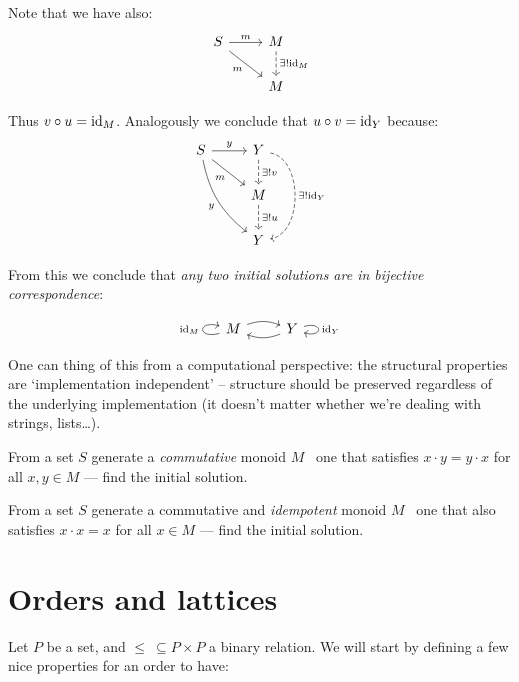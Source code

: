 Note that we have also:
$$
\begin{tikzcd}
    S \arrow[r, "m"] \arrow[rd, swap, "m"] & 
    M \arrow[d, dashed, "\exists! \id{M}"] \\
    {} & M
\end{tikzcd}
$$

Thus $v \circ u = \mathrm{id}_{ M }$. Analogously we conclude that $u \circ v = \mathrm{id}_{ Y }$
because:
$$
\begin{tikzcd}
    S \arrow[r, "y"] \arrow[rd, swap, "m"]
    \arrow[rdd, swap, bend right = 20, "y"] & 
    Y \arrow[d, dashed, "\exists! v"]
    \arrow[dd, dashed, bend left = 80, "\exists! \id{Y}"] \\
    {} & M \arrow[d, dashed, "\exists! u"] \\
    {} & Y
\end{tikzcd}
$$

From this we conclude that \textit{any two initial solutions are in bijective
correspondence}:

$$
\begin{tikzcd}
    M \arrow[r, bend left = 20] \arrow[loop left, "\id{M}"] & 
    Y \arrow[l, bend left = 20] \arrow[loop right, "\id{Y}"]
\end{tikzcd}
$$

One can thing of this from a computational perspective: the structural
properties are `implementation independent' -- structure should be preserved
regardless of the underlying implementation (it doesn't matter whether we're
dealing with strings, lists\ldots).

\begin{exercise}
From a set $S$ generate a \textit{commutative} monoid $M$ \ie~one that satisfies
$x \cdot y = y \cdot x$ for all $x, y \in M$ --- find the initial solution.
\end{exercise}

\begin{exercise}
From a set $S$ generate a commutative and \textit{idempotent} monoid $M$ \ie~one
that also satisfies $x \cdot x = x$ for all $x \in M$ --- find the initial
solution.
\end{exercise}

\section{Orders and lattices}

Let $P$ be a set, and $\leq\ \subseteq P \times P$ a binary relation. We will
start by defining a few nice properties for an order to have:

